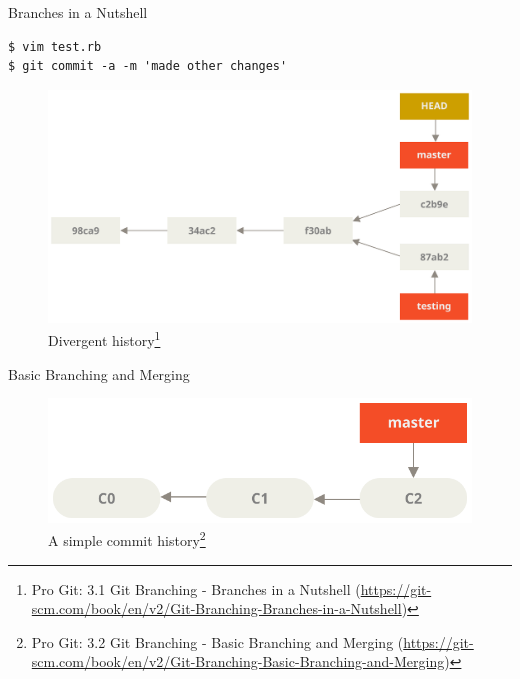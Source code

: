 \documentclass[aspectratio=169]{beamer}
\renewcommand{\footnotesize}{\tiny}
\newcommand{\sectiontitle}{}
\begin{document}
\begin{frame}[fragile]{Branches in a Nutshell}{\sectiontitle}
\begin{verbatim}
$ vim test.rb
$ git commit -a -m 'made other changes'
\end{verbatim}
\begin{figure}
    \centering
    \includegraphics[width=\textwidth,height=0.5\textheight,keepaspectratio]{advance-master}
    \caption{
        Divergent history\footnote{
            Pro Git: 3.1 Git Branching - Branches in a Nutshell
            (\url{https://git-scm.com/book/en/v2/Git-Branching-Branches-in-a-Nutshell})
        }
    }
\end{figure}
\end{frame}

\begin{frame}{Basic Branching and Merging}{\sectiontitle}
\begin{figure}
    \centering
    \includegraphics[width=\textwidth,height=0.5\textheight,keepaspectratio]{basic-branching-1}
    \caption{
        A simple commit history\footnote{
            Pro Git: 3.2 Git Branching - Basic Branching and Merging
            (\url{https://git-scm.com/book/en/v2/Git-Branching-Basic-Branching-and-Merging})
        }
    }
\end{figure}
\end{frame}
\end{document}
